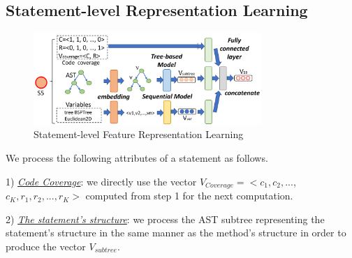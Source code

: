 
\subsection{Statement-level Representation Learning}

\begin{figure}[t]
	\centering
	\includegraphics[width=3.4in]{graphs/step-2-statement-new.png}
	\caption{Statement-level Feature Representation Learning}
	\label{statement-level-feature-learning}
\end{figure}

We process the following attributes of a statement as follows.

1) {\em \underline{Code Coverage}}: we directly use the vector
$V_{Coverage} = <c_1, c_2, ...$, $c_K, r_1, r_2, ..., r_K>$ computed
from step 1 for the next computation.





2) {\em \underline{The statement's structure}}: we process the AST
subtree representing the statement's structure in the same manner as
the method's structure in order to produce the vector $V_{subtree}$.



